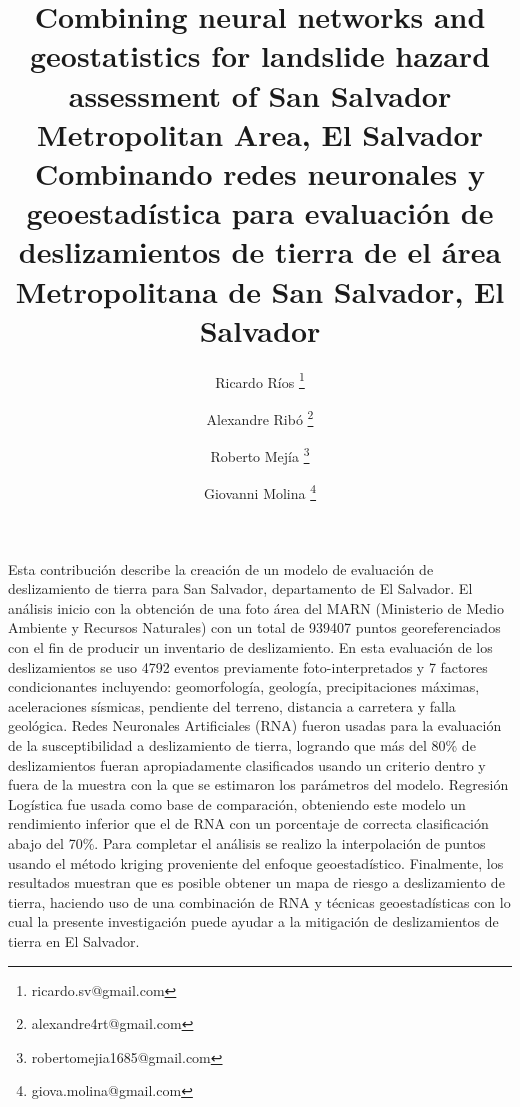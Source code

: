 \documentclass[11pt,twoside]{rmta2010esp}%
\begin{document}
\title{Combining neural networks and geostatistics for landslide hazard assessment of San Salvador Metropolitan Area, El Salvador 
\newline
\newline
Combinando redes neuronales y geoestad\'{i}stica para evaluaci\'{o}n de deslizamientos de tierra de el \'{a}rea Metropolitana de San Salvador, El Salvador}

\author[1]{Ricardo R\'{i}os \thanks{ricardo.sv@gmail.com}}
\author[2]{Alexandre Rib\'{o} \thanks{alexandre4rt@gmail.com}}
\author[3]{Roberto Mej\'{i}a \thanks{robertomejia1685@gmail.com}}
\author[4]{Giovanni Molina \thanks{giova.molina@gmail.com}}




\maketitle


\begin{resumen}
Esta contribución describe la creaci\'{o}n de un modelo de evaluaci\'{o}n de deslizamiento de tierra para San Salvador, departamento de El Salvador. El an\'{a}lisis inicio con la obtenci\'{o}n de una foto \'{a}rea del MARN (Ministerio de Medio Ambiente y Recursos Naturales) con un total de 939407 puntos georeferenciados con el fin de producir un inventario de deslizamiento. En esta evaluaci\'{o}n de los deslizamientos se uso 4792 eventos previamente foto-interpretados y 7 factores condicionantes incluyendo: geomorfolog\'{i}a, geolog\'{i}a, precipitaciones m\'{a}ximas, aceleraciones s\'{i}smicas, pendiente del terreno, distancia a carretera y falla geol\'{o}gica. Redes Neuronales Artificiales (RNA) fueron usadas para la evaluaci\'{o}n de la susceptibilidad a deslizamiento de tierra, logrando que m\'{a}s del 80\% de deslizamientos fueran apropiadamente clasificados usando un criterio dentro y fuera de la muestra con la que se estimaron los parámetros del modelo. Regresi\'{o}n Log\'{i}stica fue usada como base de comparaci\'{o}n, obteniendo este modelo un rendimiento inferior que el de RNA con un porcentaje de correcta clasificaci\'{o}n abajo del 70\%. Para completar el an\'{a}lisis se realizo la interpolaci\'{o}n de puntos usando el m\'{e}todo kriging proveniente del enfoque geoestad\'{i}stico. Finalmente, los resultados muestran que es posible obtener un mapa de riesgo a deslizamiento de tierra, haciendo uso de una combinación de RNA y t\'{e}cnicas geoestad\'{i}sticas con lo cual la presente investigaci\'{o}n puede ayudar a la mitigaci\'{o}n de deslizamientos de tierra en El Salvador.
\end{resumen}
\end{document}
